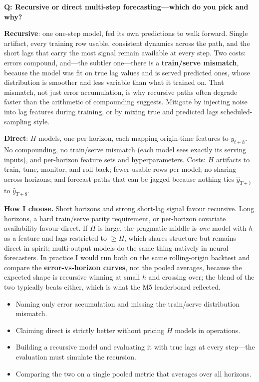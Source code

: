 \begin{interviewq}
\textbf{Q: Recursive or direct multi-step forecasting---which do you pick and why?}

 \quad {} \quad \badgefreq{\freqmed}

\stronganswer

\textbf{Recursive}: one one-step model, fed its own predictions to walk forward. Single artifact, every training row usable, consistent dynamics across the path, and the short lags that carry the most signal remain available at every step. Two costs: errors compound, and---the subtler one---there is a \textbf{train/serve mismatch}, because the model was fit on true lag values and is served predicted ones, whose distribution is smoother and less variable than what it trained on. That mismatch, not just error accumulation, is why recursive paths often degrade faster than the arithmetic of compounding suggests. Mitigate by injecting noise into lag features during training, or by mixing true and predicted lags scheduled-sampling style.

\textbf{Direct}: $H$ models, one per horizon, each mapping origin-time features to $y_{t+h}$. No compounding, no train/serve mismatch (each model sees exactly its serving inputs), and per-horizon feature sets and hyperparameters. Costs: $H$ artifacts to train, tune, monitor, and roll back; fewer usable rows per model; no sharing across horizons; and forecast paths that can be jagged because nothing ties $\hat{y}_{T+7}$ to $\hat{y}_{T+8}$.

\textbf{How I choose.} Short horizons and strong short-lag signal favour recursive. Long horizons, a hard train/serve parity requirement, or per-horizon covariate availability favour direct. If $H$ is large, the pragmatic middle is \emph{one} model with $h$ as a feature and lags restricted to $\ge H$, which shares structure but remains direct in spirit; multi-output models do the same thing natively in neural forecasters. In practice I would run both on the same rolling-origin backtest and compare the \textbf{error-vs-horizon curves}, not the pooled averages, because the expected shape is recursive winning at small $h$ and crossing over; the blend of the two typically beats either, which is what the M5 leaderboard reflected.

\redflags
\begin{itemize}
    \item Naming only error accumulation and missing the train/serve distribution mismatch.
    \item Claiming direct is strictly better without pricing $H$ models in operations.
    \item Building a recursive model and evaluating it with true lags at every step---the evaluation must simulate the recursion.
    \item Comparing the two on a single pooled metric that averages over all horizons.
\end{itemize}


\end{interviewq}
